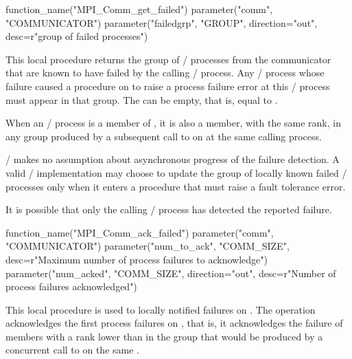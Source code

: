 \begin{mpi-binding}
    function_name("MPI_Comm_get_failed")
    parameter("comm", "COMMUNICATOR")
    parameter("failedgrp", "GROUP", direction="out", desc=r"group of failed processes")
\end{mpi-binding}

\par
This local procedure returns the group  of \MPI/ processes from the
communicator  that are known to have failed by the calling \MPI/ process.
Any \MPI/ process whose failure caused a procedure on  to raise
a process failure error at this \MPI/ process must appear in that group.
The  can be empty, that is, equal to .

When an \MPI/ process is a member of , it is also a member,
with the same rank, in any group produced by a subsequent call to  on  at the same calling process.

\begin{users}
\MPI/ makes no assumption about asynchronous
progress of the failure detection. A valid \MPI/ implementation may choose
to update the group of locally known failed \MPI/ processes only when it enters
a procedure that must raise a fault tolerance error.

It is possible that only the calling \MPI/ process has
detected the reported failure.
\end{users}

\begin{mpi-binding}
    function_name("MPI_Comm_ack_failed")
    parameter("comm", "COMMUNICATOR")
    parameter("num_to_ack", "COMM_SIZE", desc=r"Maximum number of process failures to acknowledge")
    parameter("num_acked", "COMM_SIZE", direction="out", desc=r"Number of process failures acknowledged")
\end{mpi-binding}

\par
This local procedure is used to
locally notified failures on . The operation acknowledges the first 
process failures on , that is, it acknowledges the failure of members with a rank lower than
 in the group that would be produced by a concurrent call to 
on the same .

